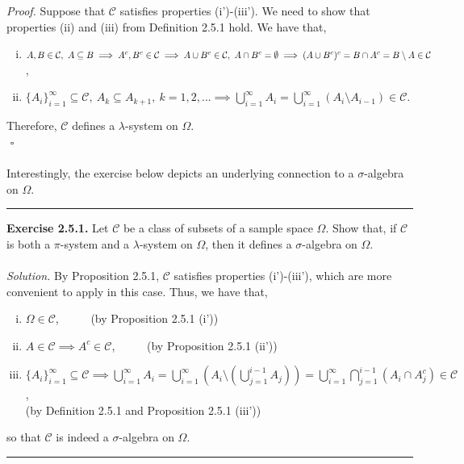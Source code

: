 \documentclass{article}
\begin{document}
\textit{Proof.} Suppose that $\mathcal{C}$ satisfies properties (i')-(iii'). We need to show that properties (ii) and (iii) from Definition 2.5.1 hold. We have that,
\begin{enumerate}[(i)]\addtocounter{enumi}{1}
	\item $A, B \in \mathcal{C}, \ A \subseteq B \implies A^c, B^c \in \mathcal{C} \implies A \cup B^c \in \mathcal{C}, \ A \cap B^c = \emptyset  \\ \implies (A \cup B^c)^c = B \cap A^c = B \setminus A \in \mathcal{C}$,
	\item $\{A_i\}_{i=1}^{\infty} \subseteq \mathcal{C}, \ A_k \subseteq A_{k+1}, \ k=1,2,... \implies \bigcup_{i=1}^{\infty}A_i = \bigcup_{i=1}^{\infty}(A_i \setminus A_{i-1}) \in \mathcal{C}$.
\end{enumerate}
Therefore, $\mathcal{C}$ defines a $\lambda$-system on $\Omega$. \\ ${}$ \hfill $\square$ \\\\
Interestingly, the exercise below depicts an underlying connection to a $\sigma$-algebra on $\Omega$.
\begin{center}
	\noindent\rule{12cm}{0.4pt}
\end{center}
\textbf{Exercise 2.5.1.} Let $\mathcal{C}$ be a class of subsets of a sample space $\Omega$. Show that, if $\mathcal{C}$ is both a $\pi$-system and a $\lambda$-system on $\Omega$, then it defines a $\sigma$-algebra on $\Omega$.\\\\
\textit{Solution.} By Proposition 2.5.1, $\mathcal{C}$ satisfies properties (i')-(iii'), which are more convenient to apply in this case. Thus, we have that,
\begin{enumerate}[(i)]
	\item $\Omega \in \mathcal{C}$, \ \ \ \ \ (by Proposition 2.5.1 (i'))
	\item $A \in \mathcal{C} \implies A^c \in \mathcal{C}$, \ \ \ \ \ (by Proposition 2.5.1 (ii'))
	\item $\{A_i\}_{i=1}^{\infty} \subseteq \mathcal{C} \implies \bigcup_{i=1}^{\infty}A_i = \bigcup_{i=1}^{\infty}(A_i \setminus (\bigcup_{j=1}^{i-1}A_j)) = \bigcup_{i=1}^{\infty}\bigcap_{j=1}^{i-1}(A_i \cap A_j^c) \in \mathcal{C}$, \\ (by Definition 2.5.1 and Proposition 2.5.1 (iii'))
\end{enumerate}
so that $\mathcal{C}$ is indeed a $\sigma$-algebra on $\Omega$.
\begin{center}
	\noindent\rule{12cm}{0.4pt}
\end{center}
\end{document}
